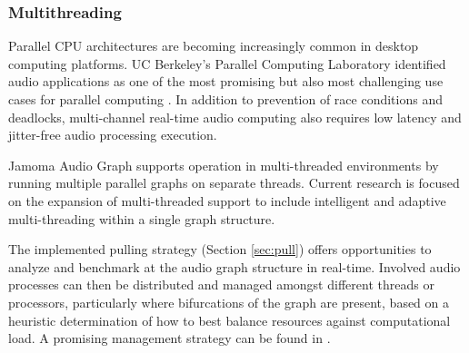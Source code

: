 \documentclass[twoside,a4paper]{article}
\begin{document}




\subsubsection{Multithreading} %

Parallel CPU architectures are becoming increasingly common in desktop computing platforms.
UC Berkeley's Parallel Computing Laboratory identified audio applications as one of the most promising but also most challenging use cases for parallel computing \cite{asanovic2008parallel}. 
In addition to prevention of race conditions and deadlocks, multi-channel real-time audio computing also requires low latency and jitter-free audio processing execution.

Jamoma Audio Graph supports operation in multi-threaded environments by running multiple parallel graphs on separate threads.  Current research is focused on the expansion of multi-threaded support to include intelligent and adaptive multi-threading within a single graph structure.  

The implemented pulling strategy (Section \ref{sec:pull}) offers opportunities to analyze and benchmark at the audio graph structure in real-time.  Involved audio processes can then be distributed and managed amongst different threads or processors, particularly where bifurcations of the graph are present, based on a heuristic determination of how to best balance resources against computational load.  A promising management strategy can be found in \cite{PartzschAES122}.


\end{document}
